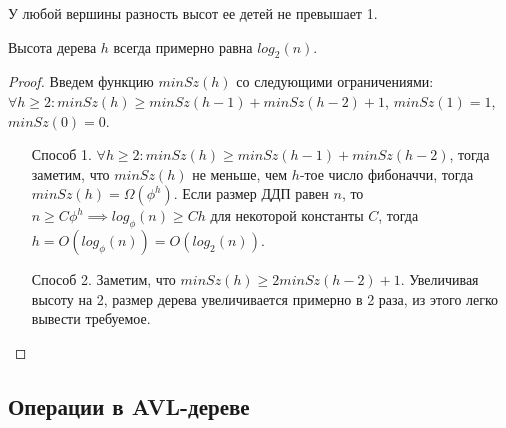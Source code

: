 \begin{invariant}
    У любой вершины разность высот ее детей не превышает 1.
\end{invariant}


\begin{corollary}
    Высота дерева $h$ всегда примерно равна $log_2(n)$.
\end{corollary}

\begin{proof}
    Введем функцию $minSz(h)$ со следующими ограничениями:
    $\forall h \geq 2: minSz(h) \geq minSz(h - 1) + minSz(h - 2) + 1$, $minSz(1) = 1$, $minSz(0) = 0$.
    \begin{enumerate}
        \item[Способ 1.] $\forall h \geq 2: minSz(h) \geq minSz(h - 1) + minSz(h - 2)$, тогда заметим, что $minSz(h)$ не меньше, чем $h$-тое число фибоначчи, тогда $minSz(h) = \Omega(\phi^h)$. Если размер ДДП равен $n$, то $n \geq C \phi^h \implies log_\phi(n) \geq C h$ для некоторой константы $C$, тогда $h = O(log_\phi(n)) = O(log_2(n))$.
        \item[Способ 2.] Заметим, что $minSz(h) \geq 2minSz(h - 2) + 1$. Увеличивая высоту на 2, размер дерева увеличивается примерно в 2 раза, из этого легко вывести требуемое.
    \end{enumerate}
\end{proof}



\subsection{Операции в AVL-дереве}



